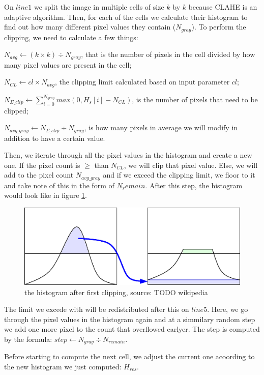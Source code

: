On $line 1$ we split the image in multiple cells of size $k$ by $k$ because CLAHE is an adaptive algorithm.
Then, for each of the cells we calculate their histogram to find out how many different pixel values they contain ($N_{gray}$). To perform the clipping, we need to calculate a few things:

$N_{avg} \gets (k \times k) \div N_{gray}$, that is the number of pixels in the cell divided by how many pixel values are present in the cell;

$N_{CL} \gets cl \times N_{avg}$, the clipping limit calculated based on input parameter $cl$;

$N_{\Sigma\_clip} \gets \sum_{i=0}^{N_{gray}} max(0, H_s[i] - N_{CL})$, is the number of pixels that need to be clipped;

$N_{avg\_gray} \gets N_{\Sigma\_clip} \div N_{gray}$, is how many pixels in average we will modify in addition to have a certain value.

Then, we iterate through all the pixel values in the histogram and create a new one. If the pixel count is $\geq$ than $N_{CL}$, we will clip that pixel value. Else, we will add to the pixel count $N_{avg\_gray}$ and if we exceed the clipping limit, we floor to it and take note of this in the form of $N_remain$. After this step, the histogram would look like in figure \ref{fig:CLAHE_hist}.

\begin{figure}[h!]
    \centering
    \includegraphics[width=0.4\columnwidth]{img/algos/Clahe-redistribution.eps}
    \caption{the histogram after first clipping, source: TODO wikipedia}
    \label{fig:CLAHE_hist}
\end{figure}


The limit we excede with will be redistributed after this on $line 5$. Here, we go through the pixel values in the histogram again and at a simmilary random step we add one more pixel to the count that overflowed earlyer. The step is computed by the formula: $step \gets N_{gray} \div N_{remain}$.

Before starting to compute the next cell, we adjust the current one acoording to the new histogram we just computed: $H_{res}$.

